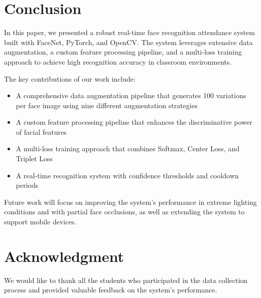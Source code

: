 \documentclass[conference]{IEEEtran}
\begin{document}
\section{Conclusion}
In this paper, we presented a robust real-time face recognition attendance system built with FaceNet, PyTorch, and OpenCV. The system leverages extensive data augmentation, a custom feature processing pipeline, and a multi-loss training approach to achieve high recognition accuracy in classroom environments.

The key contributions of our work include:

\begin{itemize}
\item A comprehensive data augmentation pipeline that generates 100 variations per face image using nine different augmentation strategies
\item A custom feature processing pipeline that enhances the discriminative power of facial features
\item A multi-loss training approach that combines Softmax, Center Loss, and Triplet Loss
\item A real-time recognition system with confidence thresholds and cooldown periods
\end{itemize}

Future work will focus on improving the system's performance in extreme lighting conditions and with partial face occlusions, as well as extending the system to support mobile devices.

\section*{Acknowledgment}
We would like to thank all the students who participated in the data collection process and provided valuable feedback on the system's performance.
\end{document}
